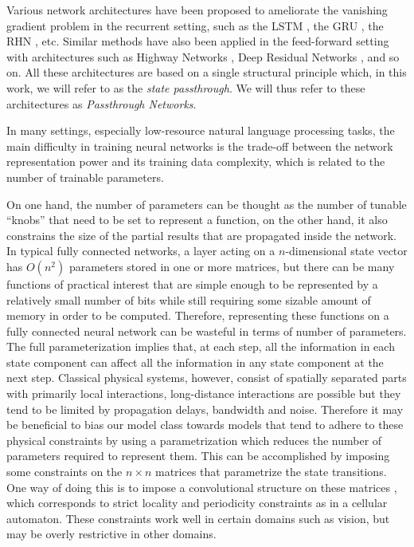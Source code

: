 \documentclass[11pt,a4paper]{article}
\begin{document}
Various network architectures have been proposed to ameliorate the vanishing gradient problem in the recurrent setting, such as the LSTM \citep{Hochreiter1997,Graves2005}, the GRU \cite{Cho2014}, the RHN \cite{Zilly2016}, etc.
Similar methods have also been applied in the feed-forward setting with architectures such as Highway Networks \cite{Srivastava2015}, Deep Residual Networks \cite{He2015}, and so on. All these architectures are based on a single structural principle which, in this work, we will refer to as the \textit{state passthrough}. We will thus refer to these architectures as \textit{Passthrough Networks}.

In many settings, especially low-resource natural language processing tasks, the main difficulty in training neural networks is the trade-off between the network representation power and its training data complexity, which is related to the number of trainable parameters.

On one hand, the number of parameters can be thought as the number of tunable ``knobs'' that need to be set to represent a function, on the other hand, it also constrains the size of the partial results that are propagated inside the network. In typical fully connected networks, a layer acting on a $n$-dimensional state vector has $O(n^2)$ parameters stored in one or more matrices, but there can be many functions of practical interest that are simple enough to be represented by a relatively small number of bits while still requiring some sizable amount of memory in order to be computed. 
Therefore, representing these functions on a fully connected neural network can be wasteful in terms of number of parameters. 
The full parameterization implies that, at each step, all the information in each state component can affect all the information in any state component at the next step. Classical physical systems, however, consist of spatially separated parts with primarily local interactions, long-distance interactions are possible but they tend to be limited by propagation delays, bandwidth and noise. 
Therefore it may be beneficial to bias our model class towards models that tend to adhere to these physical constraints by using a parametrization which reduces the number of parameters required to represent them. 
This can be accomplished by imposing some constraints on the $n \times n$ matrices that parametrize the state transitions. One way of doing this is to impose a convolutional structure on these matrices \cite{LeCun2004, Krizhevsky2012}, which corresponds to strict locality and periodicity constraints as in a cellular automaton. These constraints work well in certain domains such as vision, but may be overly restrictive in other domains.
\end{document}
